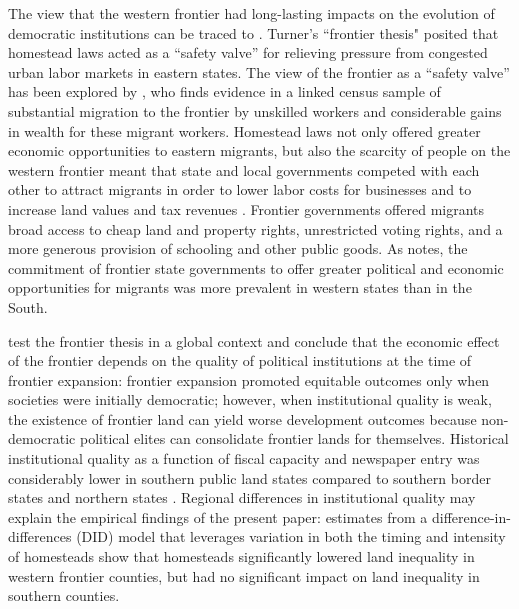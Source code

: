 \documentclass[12pt]{article}
\begin{document}
The view that the western frontier had long-lasting impacts on the evolution of democratic institutions can be traced to \citet{turner1956significance}. Turner's ``frontier thesis" posited that homestead laws acted as a ``safety valve'' for relieving pressure from congested urban labor markets in eastern states. The view of the frontier as a ``safety valve'' has been explored by \citet{ferrie1997migration}, who finds evidence in a linked census sample of substantial migration to the frontier by unskilled workers and considerable gains in wealth for these migrant workers. Homestead laws not only offered greater economic opportunities to eastern migrants, but also the scarcity of people on the western frontier meant that state and local governments competed with each other to attract migrants in order to lower labor costs for businesses and to increase land values and tax revenues \citep{engerman2005evolution}. Frontier governments offered migrants broad access to cheap land and property rights, unrestricted voting rights, and a more generous provision of schooling and other public goods. As \citet{engerman2005evolution} notes, the commitment of frontier state governments to offer greater political and economic opportunities for migrants was more prevalent in western states than in the South. 

\citet{garcia2009myth} test the frontier thesis in a global context and conclude that the economic effect of the frontier depends on the quality of political institutions at the time of frontier expansion: frontier expansion promoted equitable outcomes only when societies were initially democratic; however, when institutional quality is weak, the existence of frontier land can yield worse development outcomes because non-democratic political elites can consolidate frontier lands for themselves. Historical institutional quality as a function of fiscal capacity and newspaper entry was considerably lower in southern public land states compared to southern border states and northern states \citep{grosjean2014}. Regional differences in institutional quality may explain the empirical findings of the present paper: estimates from a difference-in-differences (DID) model that leverages variation in both the timing and intensity of homesteads show that homesteads significantly lowered land inequality in western frontier counties, but had no significant impact on land inequality in southern counties. 

\end{document}
